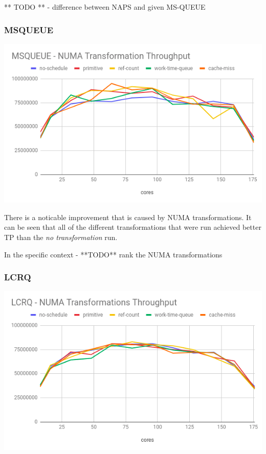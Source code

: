 \documentclass{article}
\begin{document}
 ** TODO ** - difference between NAPS and given MS-QUEUE

 \subsubsection{MSQUEUE}

 \includegraphics[width=\textwidth]{graph-msqueue.png}

 There is a noticable improvement that is caused by NUMA transformations. It can be seen that all of the different transformations that were run achieved better TP than the \textit{no transformation} run. 

 In the specific context - **TODO** rank the NUMA transformations



 \subsubsection{LCRQ}

 \includegraphics[width=\textwidth]{graph-lcrq.png}
\end{document}
